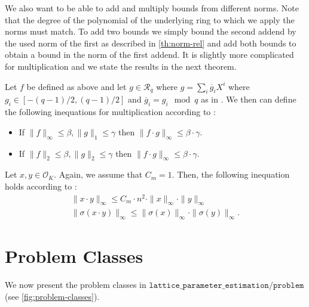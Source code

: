 We also want to be able to add and multiply bounds from different norms. Note that the degree of the polynomial of the underlying ring to which we apply the norms must match. To add two bounds we simply bound the second addend by the used norm of the first as described in \cref{th:norm-rel} and add both bounds to obtain a bound in the norm of the first addend. It is slightly more complicated for multiplication and we state the results in the next theorem.

\begin{theorem}
    Let $f$ be defined as above and let $g \in \mathcal{R}_q$ where $g = \sum_i \overline{g}_i X^i$ where $g_i \in \left[-(q-1)/2, (q-1)/2\right]$ and $\overline{g}_i = g_i \mod q$ as in \cite{BDLOP18}. We then can define the following inequations for multiplication according to \cite{BDLOP18}:

    \begin{itemize}
        \item If $\|f\|_\infty \leq \beta, \|g\|_1 \leq \gamma$ then $\|f \cdot g\|_\infty \leq \beta \cdot \gamma$.
        \item If $\|f\|_2 \leq \beta, \|g\|_2 \leq \gamma$ then $\|f \cdot g\|_\infty \leq \beta \cdot \gamma$.
    \end{itemize}

    Let $x, y \in \mathcal{O}_K$. Again, we assume that $C_m = 1$. Then, the following inequation holds according to \cite{DPSZ12}:
    \begin{align}
        \| x \cdot y \|_\infty \leq C_m \cdot n^2 \cdot \| x \|_\infty \cdot \| y \|_\infty \\
        \| \sigma(x \cdot y) \|_\infty \leq  \| \sigma(x) \|_\infty \cdot \| \sigma(y) \|_\infty.
    \end{align}
\end{theorem}




\section{Problem Classes}
We now present the problem classes in $\texttt{lattice\_parameter\_estimation/problem}$ (see \cref{fig:problem-classes}).

